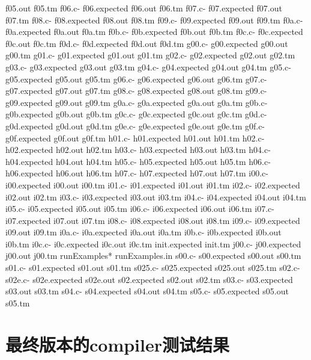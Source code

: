 \documentclass[12pt]{book}
\begin{document}
f05.out
f05.tm
f06.c-
f06.expected
f06.out
f06.tm
f07.c-
f07.expected
f07.out
f07.tm
f08.c-
f08.expected
f08.out
f08.tm
f09.c-
f09.expected
f09.out
f09.tm
f0a.c-
f0a.expected
f0a.out
f0a.tm
f0b.c-
f0b.expected
f0b.out
f0b.tm
f0c.c-
f0c.expected
f0c.out
f0c.tm
f0d.c-
f0d.expected
f0d.out
f0d.tm
g00.c-
g00.expected
g00.out
g00.tm
g01.c-
g01.expected
g01.out
g01.tm
g02.c-
g02.expected
g02.out
g02.tm
g03.c-
g03.expected
g03.out
g03.tm
g04.c-
g04.expected
g04.out
g04.tm
g05.c-
g05.expected
g05.out
g05.tm
g06.c-
g06.expected
g06.out
g06.tm
g07.c-
g07.expected
g07.out
g07.tm
g08.c-
g08.expected
g08.out
g08.tm
g09.c-
g09.expected
g09.out
g09.tm
g0a.c-
g0a.expected
g0a.out
g0a.tm
g0b.c-
g0b.expected
g0b.out
g0b.tm
g0c.c-
g0c.expected
g0c.out
g0c.tm
g0d.c-
g0d.expected
g0d.out
g0d.tm
g0e.c-
g0e.expected
g0e.out
g0e.tm
g0f.c-
g0f.expected
g0f.out
g0f.tm
h01.c-
h01.expected
h01.out
h01.tm
h02.c-
h02.expected
h02.out
h02.tm
h03.c-
h03.expected
h03.out
h03.tm
h04.c-
h04.expected
h04.out
h04.tm
h05.c-
h05.expected
h05.out
h05.tm
h06.c-
h06.expected
h06.out
h06.tm
h07.c-
h07.expected
h07.out
h07.tm
i00.c-
i00.expected
i00.out
i00.tm
i01.c-
i01.expected
i01.out
i01.tm
i02.c-
i02.expected
i02.out
i02.tm
i03.c-
i03.expected
i03.out
i03.tm
i04.c-
i04.expected
i04.out
i04.tm
i05.c-
i05.expected
i05.out
i05.tm
i06.c-
i06.expected
i06.out
i06.tm
i07.c-
i07.expected
i07.out
i07.tm
i08.c-
i08.expected
i08.out
i08.tm
i09.c-
i09.expected
i09.out
i09.tm
i0a.c-
i0a.expected
i0a.out
i0a.tm
i0b.c-
i0b.expected
i0b.out
i0b.tm
i0c.c-
i0c.expected
i0c.out
i0c.tm
init.expected
init.tm
j00.c-
j00.expected
j00.out
j00.tm
runExamples*
runExamples.in
s00.c-
s00.expected
s00.out
s00.tm
s01.c-
s01.expected
s01.out
s01.tm
s025.c-
s025.expected
s025.out
s025.tm
s02.c-
s02e.c-
s02e.expected
s02e.out
s02.expected
s02.out
s02.tm
s03.c-
s03.expected
s03.out
s03.tm
s04.c-
s04.expected
s04.out
s04.tm
s05.c-
s05.expected
s05.out
s05.tm

\chapter{最终版本的compiler测试结果}
\label{sec-12}
\end{document}
